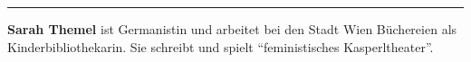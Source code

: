 \begin{center}\rule{0.5\linewidth}{0.5pt}\end{center}

\textbf{Sarah Themel} ist Germanistin und arbeitet bei den Stadt Wien
Büchereien als Kinderbibliothekarin. Sie schreibt und spielt
\enquote{feministisches Kasperltheater}.
